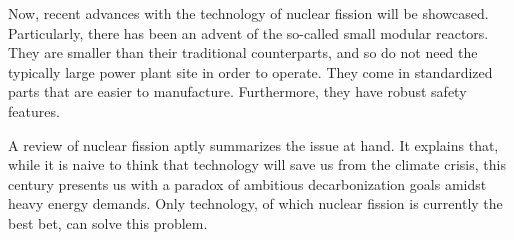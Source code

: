 \documentclass[12pt,letterpaper]{article}
\begin{document}
\begin{flushleft}
Now, recent advances with the technology of nuclear fission will be showcased. Particularly, there has been an advent of the so-called small modular reactors. They are smaller than their traditional counterparts, and so do not need the typically large power plant site in order to operate. They come in standardized parts that are easier to manufacture. Furthermore, they have robust safety features. \autocite{noauthor_what_2021}

A review of nuclear fission aptly summarizes the issue at hand. It explains that,
while it is naive to think that technology will save us from the climate crisis, this century presents us with a paradox of ambitious decarbonization goals amidst heavy energy demands. \autocite{noauthor_future_nodate} Only technology, of which nuclear fission is currently the best bet, can solve this problem.
\newpage


\printbibliography

\end{flushleft}
\end{document}
